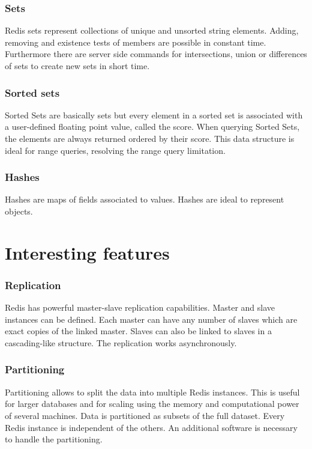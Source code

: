 \subsubsection{Sets}
Redis sets represent collections of unique and unsorted string elements. Adding,
removing and existence tests of members are possible in constant time.
Furthermore there are server side commands for intersections, union or
differences of sets to create new sets in short time. 

\subsubsection{Sorted sets}
Sorted Sets are basically sets but every element in a sorted set is associated
with a user-defined floating point value, called the score. When querying Sorted
Sets, the elements are always returned ordered by their score. This data
structure is ideal for range queries, resolving the range query limitation.

\subsubsection{Hashes}
Hashes are maps of fields associated to values. Hashes are ideal to represent
objects\cite{datatypesredis}.

\section{Interesting features}
\subsubsection{Replication}
Redis has powerful master-slave replication capabilities. Master and slave
instances can be defined. Each master can have any number of slaves which are
exact copies of the linked master. Slaves can also be linked to slaves in a
cascading-like structure. The replication works asynchronously\cite{replicaredis}.

\subsubsection{Partitioning}
Partitioning allows to split the data into multiple Redis instances. This is
useful for larger databases and for scaling using the memory and computational
power of several machines. Data is partitioned as subsets of the full dataset.
Every Redis instance is independent of the others. An additional software is
necessary to handle the partitioning\cite{partitionredis}.

